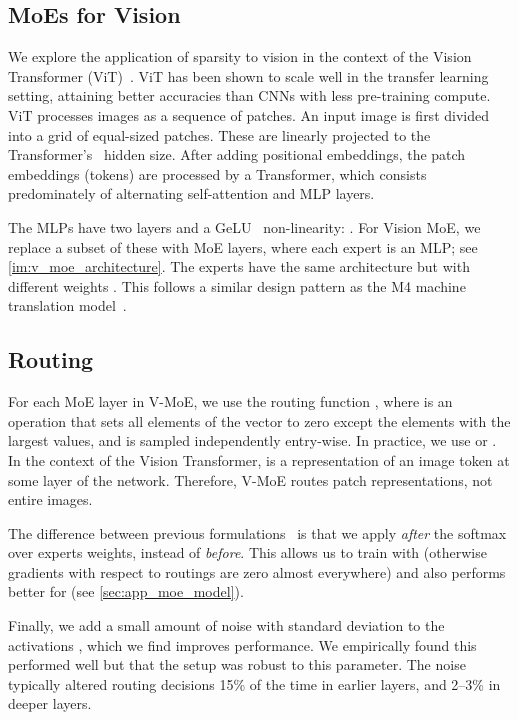 \documentclass{article}
\newcommand{\name}{Vision MoE}
\newcommand{\abbv}{{V-MoE}}
\begin{document}
\subsection{MoEs for Vision}
We explore the application of sparsity to vision in the context of the Vision Transformer (ViT)~\cite{dosovitskiy2020image}.
ViT has been shown to scale well in the transfer learning setting, attaining better accuracies than CNNs with less pre-training compute.
ViT processes images as a sequence of patches.
An input image is first divided into a grid of equal-sized patches.
These are linearly projected to the Transformer's~\cite{vaswani2017attention} hidden size.
After adding positional embeddings, the patch embeddings (tokens) are processed by a Transformer, which consists predominately of alternating self-attention and MLP layers.

The MLPs have two layers and a GeLU~\cite{hendrycks2016gaussian} non-linearity:
.
For \name{}, we replace a subset of these with MoE layers, where each expert is an MLP; see \cref{im:v_moe_architecture}. The experts have the same architecture  but with different weights 
. This follows a similar design pattern as the M4 machine translation model~\cite{lepikhin2020gshard}.


\subsection{Routing}
\label{sec:routing}
For each MoE layer in \abbv{}, we use the routing function , where  is an operation that sets all elements of the vector to zero except the elements with the largest  values, and  is sampled independently  entry-wise.
In practice, we use  or .
In the context of the Vision Transformer,  is a representation of an image token at some layer of the network.
Therefore, \abbv{} routes patch representations, not entire images.

The difference between previous formulations~\cite{shazeer2017outrageously} is that we apply  \textit{after} the softmax over experts weights, instead of \textit{before}.
This allows us to train with  (otherwise gradients with respect to routings are zero almost everywhere) and also performs better for  (see \cref{sec:app_moe_model}).

Finally, we add a small amount of noise with standard deviation  to the activations , which we find improves performance.
We empirically found this performed well but that the setup was robust to this parameter.
The noise typically altered routing decisions 15\% of the time in earlier layers, and 2--3\% in deeper layers.
\end{document}
